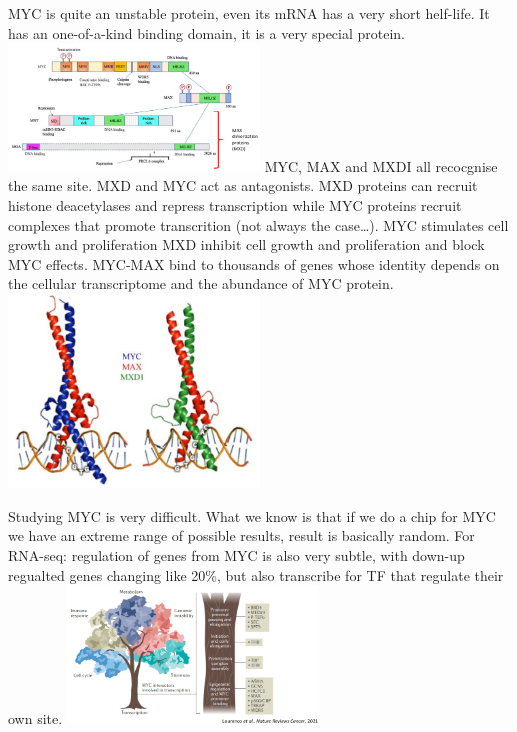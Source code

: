 MYC is quite an unstable protein, even its mRNA has a very short helf-life. It has an one-of-a-kind binding domain, it is a very special protein.
\includegraphics[width=0.5\textwidth]{../_resources/01adbb32a69ee3baec1bf9bddd890f52.png}
MYC, MAX and MXDI all recocgnise the same site.
MXD and MYC act as antagonists. MXD proteins can recruit histone deacetylases and repress transcription while MYC proteins recruit complexes that promote transcrition (not always the case\ldots). MYC stimulates cell growth and proliferation MXD inhibit cell growth and proliferation and block MYC effects.
MYC-MAX bind to thousands of genes whose identity depends on the cellular transcriptome and the abundance of MYC protein.
\includegraphics[width=0.5\textwidth]{../_resources/017e543a7782177edd93188be60ae382.png}

Studying MYC is very difficult. What we know is that if we do a chip for MYC we have an extreme range of possible results, result is basically random. For RNA-seq: regulation of genes from MYC is also very subtle, with down-up regualted genes changing like 20\%, but also transcribe for TF that regulate their own site.
\includegraphics[width=0.5\textwidth]{../_resources/e218faf59750ef1a90a9e45629f08973.png}

